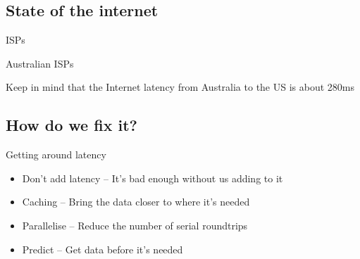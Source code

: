 \documentclass{beamer}
\begin{document}
\subsection{State of the internet}

\begin{frame}{ISPs}
\end{frame}

\begin{frame}{Australian ISPs}
  \parbox[c][1.2\paperheight]{\paperwidth} { }
  \tiny{Keep in mind that the Internet latency from Australia to the US is about 280ms}
\end{frame}


\subsection{How do we fix it?}

\begin{frame}{Getting around latency}
  \begin{block}{}
  \begin{itemize}
  \item Don't add latency -- It's bad enough without us adding to it
  \item Caching -- Bring the data closer to where it's needed
  \item Parallelise -- Reduce the number of serial roundtrips
  \item Predict -- Get data before it's needed
  \end{itemize}
  \end{block}
\end{frame}
\end{document}
